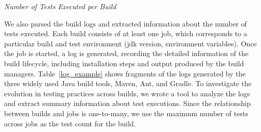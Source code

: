 

\smallskip\noindent\emph{Number of Tests Executed per Build} 

We also parsed the \Tvis build logs and extracted information about the 
number of tests executed. %
Each \Tvis build consists of at least one job, which corresponds to a particular
build and test environment (\eg jdk version, environment variables). 
Once the job is started, a log is generated, recording the detailed information
of the build lifecycle, including installation steps and output produced by the 
build managers. %
Table~\ref{log_example} shows fragments of the logs generated by the 
three widely used Java build tools, Maven, Ant, and Gradle. 
To investigate the evolution in testing practices across builds, we wrote a tool 
to analyze the logs and extract summary information about test executions.  
Since the relationship between builds and jobs is one-to-many, we use the 
maximum number of tests across jobs as the test count for the build. 




